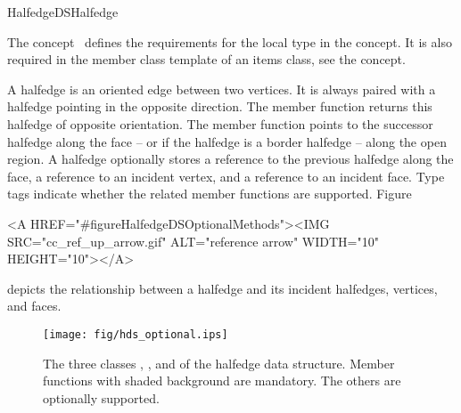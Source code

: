 
\ccRefPageBegin



\begin{ccRefConcept}{HalfedgeDSHalfedge}
\label{pageHalfedgeDSItemsHalfedgeRef}

\ccDefinition
  
The concept \ccRefName\ defines the requirements for the local  
type in the  concept. It is also required in 
the  member class template of an
items class, see the  concept.

A halfedge is an oriented edge between two vertices. It is always
paired with a halfedge pointing in the opposite direction. The
 member function returns this halfedge of opposite
orientation. The  member function points to the successor
halfedge along the face -- or if the halfedge is a border halfedge --
along the open region. A halfedge optionally stores a reference to the
previous halfedge along the face, a reference to an incident vertex,
and a reference to an incident face. Type tags indicate whether the
related member functions are supported.
Figure~\begin{ccHtmlOnly}
  <A HREF="#figureHalfedgeDSOptionalMethods"><IMG 
  SRC="cc_ref_up_arrow.gif" ALT="reference arrow" WIDTH="10" HEIGHT="10"></A>
\end{ccHtmlOnly}
depicts the relationship between a halfedge and its incident
halfedges, vertices, and faces.

\begin{ccTexOnly}
    \begin{figure}[bht]
        \begin{center}
          \parbox{\textwidth}{%
              \texttt{[image: fig/hds\_optional.ips]}%
          }
        \end{center}
        \caption{The three classes \protect{}, 
          \protect{}, and 
          \protect{} of the halfedge data structure. Member
          functions with shaded background are mandatory. The others
          are optionally supported.}
        \label{figureHalfedgeDSOptionalMethods}
    \end{figure}
\end{ccTexOnly}


\end{ccRefConcept}
